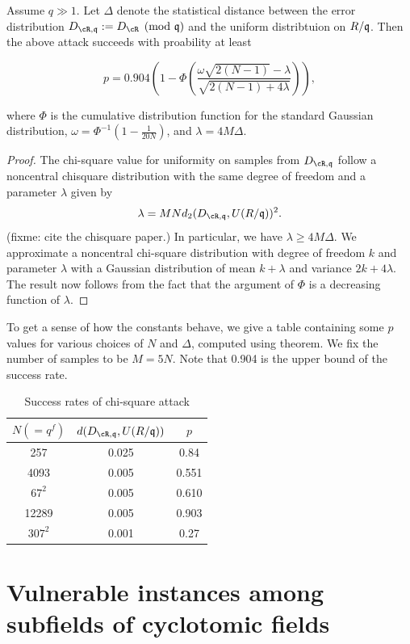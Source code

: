 \documentclass{amsart}
\begin{document}
\begin{theorem}
Assume $q \gg 1$. Let $\Delta$ denote the statistical distance between the error distribution $D_{\cR, \fq} := D_{\cR} \pmod{\fq}$ and the uniform distribtuion on $R/\mathfrak{q}$. Then the above attack succeeds with proability at least

$$p = 0.904 (1- \Phi(\frac{\omega \sqrt{2(N-1)}- \lambda}{\sqrt{2(N-1) +4\lambda}})),$$

where $\Phi$ is the cumulative distribution function for the standard Gaussian distribution, $\omega = \Phi^{-1}(1- \frac{1}{20N})$, and $\lambda = 4 M \Delta$.
\end{theorem}

\begin{proof}
The chi-square value for uniformity on samples from $D_{\cR, \fq}$ follow a noncentral chisquare distribution with the same degree of freedom and a parameter $\lambda$ given by
\[
    \lambda = MN d_2(D_{\cR, \fq}, U(R/\fq))^2.
\]
(fixme: cite the chisquare paper.)
In particular, we have $\lambda \geq  4M\Delta$.
We approximate a noncentral chi-square distribution with
degree of freedom $k$ and parameter $\lambda$ with a Gaussian
distribution of mean $k + \lambda$ and variance $2k + 4\lambda$. The result now follows from the fact that the argument of $\Phi$ is a decreasing function of $\lambda$.
\end{proof}

To get a sense of how the constants behave, we give a table containing some $p$ values for various choices of $N$ and $\Delta$, computed using theorem. We fix the number of samples to be $M = 5N$. Note that 0.904 is the upper bound of the success rate.

\begin{table}[H]
\caption{Success rates of chi-square attack}
\begin{tabular}{c|c|c}
$N (= q^f)$ & $d(D_{\cR, \fq},U(R/\fq))$ & $p$ \\ \hline
257 & 0.025 & 0.84 \\
4093 &   0.005     &  0.551 \\
$67^2$ & 0.005 & 0.610 \\
12289 & 0.005  & 0.903 \\
$307^2$ & 0.001 & 0.27
\end{tabular}
\end{table}

\section{Vulnerable instances among subfields of cyclotomic fields}\label{sec: sub-cyclotomics}
\end{document}
